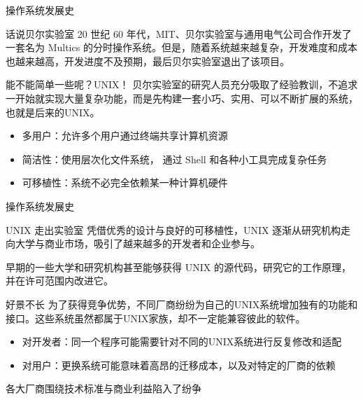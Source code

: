 \documentclass[aspectratio=169]{beamer}
\begin{document}
\begin{frame}{操作系统发展史}
\begin{block}{话说贝尔实验室}
\hspace*{2em}20 世纪 60 年代，MIT、贝尔实验室与通用电气公司合作开发了一套名为 Multics 的分时操作系统。但是，随着系统越来越复杂，开发难度和成本也越来越高，开发进度不及预期，最后贝尔实验室退出了该项目。
\end{block}
\pause
\begin{block}{能不能简单一些呢？UNIX！}
\hspace*{2em}贝尔实验室的研究人员充分吸取了经验教训，不追求一开始就实现大量复杂功能，而是先构建一套小巧、实用、可以不断扩展的系统，也就是后来的UNIX。
\begin{itemize}
	\item 多用户：允许多个用户通过终端共享计算机资源
	\item 简洁性：使用层次化文件系统，
	通过 Shell 和各种小工具完成复杂任务
	\item 可移植性：系统不必完全依赖某一种计算机硬件
\end{itemize}
\end{block}
\end{frame}


\begin{frame}{操作系统发展史}
	
	\begin{block}{UNIX 走出实验室}
		\hspace*{2em}凭借优秀的设计与良好的可移植性，UNIX 逐渐从研究机构走向大学与商业市场，吸引了越来越多的开发者和企业参与。
		
		\par\hspace*{2em}早期的一些大学和研究机构甚至能够获得 UNIX 的源代码，研究它的工作原理，并在许可范围内改进它。
	\end{block}
	\pause
	\begin{block}{好景不长}
		\hspace*{2em}为了获得竞争优势，不同厂商纷纷为自己的UNIX系统增加独有的功能和接口。这些系统虽然都属于UNIX家族，却不一定能兼容彼此的软件。
		\begin{itemize}
			\item 对开发者：同一个程序可能需要针对不同的UNIX系统进行反复修改和适配
			\item 对用户：更换系统可能意味着高昂的迁移成本，以及对特定的厂商的依赖
		\end{itemize}
		\par\hspace*{2em}\alert{各大厂商围绕技术标准与商业利益陷入了纷争}
	\end{block}
\end{frame}
\end{document}
